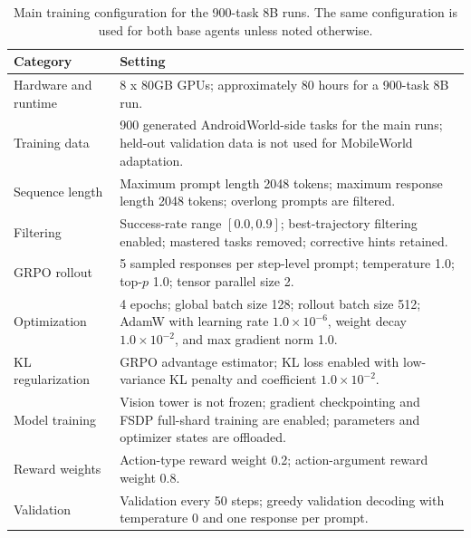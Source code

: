 \begin{table}[!t]
\centering
\paperTable
\caption{Main \hifpo training configuration for the 900-task 8B runs. The same configuration is used for both base agents unless noted otherwise.}
\label{tab:training_details}
\begin{tabular}{L{0.19\textwidth} L{0.73\textwidth}}
\toprule
\textbf{Category} & \textbf{Setting} \\
\midrule
Hardware and runtime & 8 x 80GB GPUs; approximately 80 hours for a 900-task 8B run. \\
Training data & 900 generated AndroidWorld-side tasks for the main runs; held-out validation data is not used for MobileWorld adaptation. \\
Sequence length & Maximum prompt length 2048 tokens; maximum response length 2048 tokens; overlong prompts are filtered. \\
Filtering & Success-rate range $[0.0,0.9]$; best-trajectory filtering enabled; mastered tasks removed; corrective hints retained. \\
GRPO rollout & 5 sampled responses per step-level prompt; temperature 1.0; top-$p$ 1.0; tensor parallel size 2. \\
Optimization & 4 epochs; global batch size 128; rollout batch size 512; AdamW with learning rate $1.0\times10^{-6}$, weight decay $1.0\times10^{-2}$, and max gradient norm 1.0. \\
KL regularization & GRPO advantage estimator; KL loss enabled with low-variance KL penalty and coefficient $1.0\times10^{-2}$. \\
Model training & Vision tower is not frozen; gradient checkpointing and FSDP full-shard training are enabled; parameters and optimizer states are offloaded. \\
Reward weights & Action-type reward weight 0.2; action-argument reward weight 0.8. \\
Validation & Validation every 50 steps; greedy validation decoding with temperature 0 and one response per prompt. \\
\bottomrule
\end{tabular}
\end{table}
